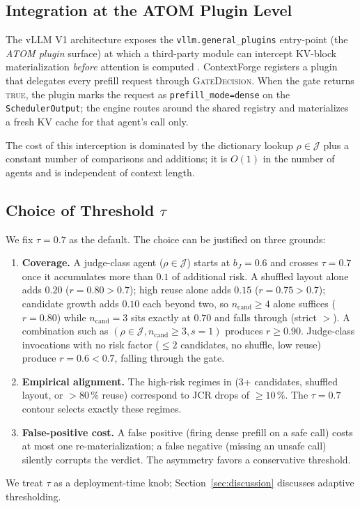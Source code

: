 \documentclass[10pt,twocolumn]{article}
\newcommand{\Judge}{\mathcal{J}}
\newcommand{\Cand}{n_{\text{cand}}}
\newcommand{\Shuf}{s}
\newcommand{\GateDecision}{\textsc{GateDecision}}
\begin{document}
\subsection{Integration at the ATOM Plugin Level}
\label{sec:invariant:atom}

The vLLM V1 architecture exposes the \texttt{vllm.general\_plugins}
entry-point (the \emph{ATOM plugin} surface) at which a third-party module
can intercept KV-block materialization \emph{before} attention is computed
\cite{vllm}. ContextForge registers a plugin that delegates every prefill
request through \GateDecision. When the gate returns \textsc{true}, the
plugin marks the request as \texttt{prefill\_mode=dense} on the
\texttt{SchedulerOutput}; the engine routes around the shared registry and
materializes a fresh KV cache for that agent's call only.

The cost of this interception is dominated by the dictionary lookup
$\rho \in \Judge$ plus a constant number of comparisons and additions; it
is $O(1)$ in the number of agents and is independent of context length.

\subsection{Choice of Threshold $\tau$}
\label{sec:invariant:threshold}

We fix $\tau = 0.7$ as the default. The choice can be justified on three
grounds:
\begin{enumerate}
  \item \textbf{Coverage.} A judge-class agent ($\rho \in \Judge$) starts at
        $b_J = 0.6$ and crosses $\tau = 0.7$ once it accumulates more than
        $0.1$ of additional risk. A shuffled layout alone adds $0.20$
        ($r = 0.80 > 0.7$); high reuse alone adds $0.15$ ($r = 0.75 > 0.7$);
        candidate growth adds $0.10$ each beyond two, so $\Cand \geq 4$
        alone suffices ($r = 0.80$) while $\Cand = 3$ sits exactly at $0.70$
        and falls through (strict $>$). A combination such as
        $(\rho \in \Judge, \Cand \geq 3, \Shuf = 1)$ produces
        $r \geq 0.90$. Judge-class invocations with no risk factor
        ($\leq 2$ candidates, no shuffle, low reuse) produce
        $r = 0.6 < 0.7$, falling through the gate.
  \item \textbf{Empirical alignment.} The high-risk regimes in
        \cite{jcrfailure} (3+ candidates, shuffled layout, or
        $>80\,\%$ reuse) correspond to JCR drops of $\geq 10\,\%$. The
        $\tau = 0.7$ contour selects exactly these regimes.
  \item \textbf{False-positive cost.} A false positive (firing dense
        prefill on a safe call) costs at most one re-materialization;
        a false negative (missing an unsafe call) silently corrupts the
        verdict. The asymmetry favors a conservative threshold.
\end{enumerate}
We treat $\tau$ as a deployment-time knob; Section~\ref{sec:discussion}
discusses adaptive thresholding.
\end{document}
